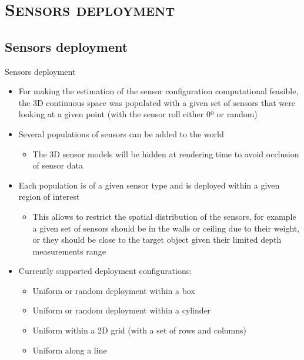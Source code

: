 \section{\scshape Sensors deployment}
\subsection*{Sensors deployment}
\begin{frame}{Sensors deployment}
	\begin{itemize}
		\item For making the estimation of the sensor configuration computational feasible, the 3D continuous space was populated with a given set of sensors that were looking at a given point (with the sensor roll either 0º or random)
		\item Several populations of sensors can be added to the world
			\begin{itemize}
				\item The 3D sensor models will be hidden at rendering time to avoid occlusion of sensor data
			\end{itemize}
		\item Each population is of a given sensor type and is deployed within a given region of interest 
		\begin{itemize}
			\item This allows to restrict the spatial distribution of the sensors, for example a given set of sensors should be in the walls or ceiling due to their weight, or they should be close to the target object given their limited depth measurements range
		\end{itemize}
		\item Currently supported deployment configurations:
		\begin{itemize}
			\item Uniform or random deployment within a box
			\item Uniform or random deployment within a cylinder
			\item Uniform within a 2D grid (with a set of rows and columns)
			\item Uniform along a line
		\end{itemize}
	\end{itemize}
\end{frame}

